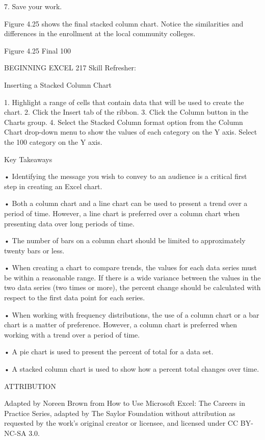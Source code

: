 7. Save your work.

Figure 4.25 shows the final stacked column chart. Notice the similarities and differences in the
enrollment at the local community colleges.




Figure 4.25 Final 100%




BEGINNING EXCEL 217
Skill Refresher:


Inserting a Stacked Column Chart

1. Highlight a range of cells that contain data that will be used to create the chart.
2. Click the Insert tab of the ribbon.
3. Click the Column button in the Charts group.
4. Select the Stacked Column format option from the Column Chart drop-down menu to show the values of
each category on the Y axis. Select the 100%
category on the Y axis.




Key Takeaways


• Identifying the message you wish to convey to an audience is a critical first step in creating an Excel chart.

• Both a column chart and a line chart can be used to present a trend over a period of time. However, a line
chart is preferred over a column chart when presenting data over long periods of time.

• The number of bars on a column chart should be limited to approximately twenty bars or less.

• When creating a chart to compare trends, the values for each data series must be within a reasonable range.
If there is a wide variance between the values in the two data series (two times or more), the percent change
should be calculated with respect to the first data point for each series.

• When working with frequency distributions, the use of a column chart or a bar chart is a matter of
preference. However, a column chart is preferred when working with a trend over a period of time.

• A pie chart is used to present the percent of total for a data set.

• A stacked column chart is used to show how a percent total changes over time.



ATTRIBUTION

Adapted by Noreen Brown from How to Use Microsoft Excel: The Careers in Practice Series, adapted
by The Saylor Foundation without attribution as requested by the work’s original creator or
licensee, and licensed under CC BY-NC-SA 3.0.




